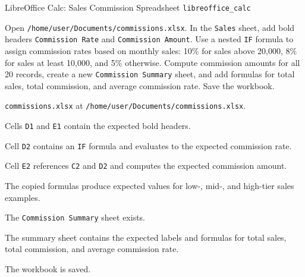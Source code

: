 \begin{taskexample}{LibreOffice Calc: Sales Commission Spreadsheet}
 \texttt{libreoffice\_calc}

 Open \texttt{/home/user/Documents/commissions.xlsx}. In the
\texttt{Sales} sheet, add bold headers \texttt{Commission Rate} and
\texttt{Commission Amount}. Use a nested \texttt{IF} formula to assign
commission rates based on monthly sales: 10\% for sales above 20,000, 8\% for
sales at least 10,000, and 5\% otherwise. Compute commission amounts for all
20 records, create a new \texttt{Commission Summary} sheet, and add formulas
for total sales, total commission, and average commission rate. Save the
workbook.

\texttt{commissions.xlsx} at \texttt{/home/user/Documents/commissions.xlsx}.

\begin{compactitem}
    \item Cells \texttt{D1} and \texttt{E1} contain the expected bold headers.
    \item Cell \texttt{D2} contains an \texttt{IF} formula and evaluates to
    the expected commission rate.
    \item Cell \texttt{E2} references \texttt{C2} and \texttt{D2} and computes
    the expected commission amount.
    \item The copied formulas produce expected values for low-, mid-, and
    high-tier sales examples.
    \item The \texttt{Commission Summary} sheet exists.
    \item The summary sheet contains the expected labels and formulas for total
    sales, total commission, and average commission rate.
    \item The workbook is saved.
\end{compactitem}
\end{taskexample}


